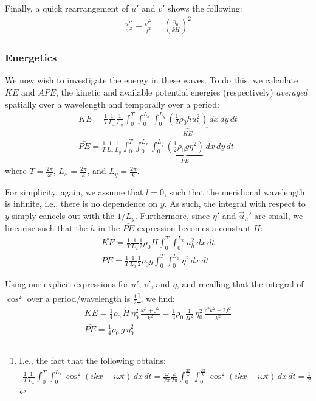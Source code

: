Finally, a quick rearrangement of \(u'\) and \(v'\) shows the following:
\begin{align*}
    \frac{u'^2}{\omega^2}
    +
    \frac{v'^2}{f^2}
    =
    \left( \frac{\eta_0}{kH} \right)^2
\end{align*}

\subsubsection{Energetics}

We now wish to investigate the energy in these waves. To do this, we calculate \(\bar{KE}\) and \(\bar{APE}\), the kinetic and available potential energies (respectively) \textit{averaged} spatially over a wavelength and temporally over a period:
\begin{align*}
    \bar{KE}=\frac{1}{T}\frac{1}{L_x}\frac{1}{L_y}
    \int_{0}^{T}
    \int_{0}^{L_x}
    \int_{0}^{L_y}
    \underbrace{\left( \frac{1}{2}\rho_0
    h
    u_h^2 \right)}_{KE}
    \,dx\,dy\,dt
    \\
    \bar{PE}=\frac{1}{T}\frac{1}{L_x}\frac{1}{L_y}
    \int_{0}^{T}
    \int_{0}^{L_x}
    \int_{0}^{L_y}
    \underbrace{\left( \frac{1}{2}\rho_0
    g
    \eta^2 \right)}_{PE}
    \,dx\,dy\,dt
\end{align*}
where \(T=\frac{2\pi}{\omega}\), \(L_x=\frac{2\pi}{k}\), and \(L_y=\frac{2\pi}{k}\).

For simplicity, again, we assume that \(l=0\), such that the meridional wavelength is infinite, i.e., there is no dependence on \(y\). As such, the integral with respect to \(y\) simply cancels out with the \(1/L_y\). Furthermore, since \(\eta'\) and \(\vec{u}_h'\) are small, we linearise such that the \(h\) in the \(\bar{PE}\) expression becomes a constant \(H\):
\begin{align*}
    \bar{KE}=\frac{1}{T}\frac{1}{L_x}
    \frac{1}{2}\rho_0
    H
    \int_{0}^{T}
    \int_{0}^{L_x}
    u_h^2
    \,dx\,dt
    \\
    \bar{PE}=\frac{1}{T}\frac{1}{L_x}
    \frac{1}{2}\rho_0
    g
    \int_{0}^{T}
    \int_{0}^{L_x}
    \eta^2
    \,dx\,dt
\end{align*}

Using our explicit expressions for \(u'\), \(v'\), and \(\eta\), and recalling that the integral of \(\cos^2\) over a period/wavelength is \(\frac{1}{2}\)\footnote{
    I.e., the fact that the following obtains:
    \begin{align*}
        \frac{1}{T}\frac{1}{L_x}
        \int_{0}^{T}
        \int_{0}^{L_x}
        \cos^2\left( ikx-i\omega t \right)
        \,dx\,dt = \frac{\omega}{2\pi}\frac{k}{2\pi}
        \int_{0}^{\frac{2\pi}{\omega}}
        \int_{0}^{\frac{2\pi}{k}}
        \cos^2\left( ikx-i\omega t \right)
        \,dx\,dt = \frac{1}{2}
    \end{align*}
}, we find:
\begin{gather*}
    \bar{KE} = \frac{1}{4}\rho_0\, H\, \eta_0^2\,\frac{\omega^2+f^2}{k^2}
    =\frac{1}{4}\rho_0\, \frac{1}{H^2}\, \eta_0^2\,\frac{c^2k^2+2f^2}{k^2}
    \\
    \bar{PE}=\frac{1}{4}\rho_0 \,g\, \eta_0^2
\end{gather*}

